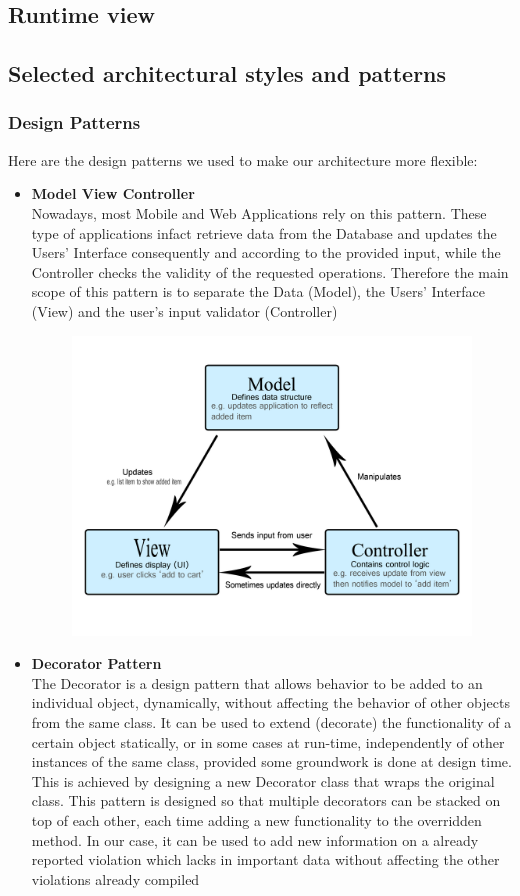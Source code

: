 \documentclass[12pt,a4paper]{article}
\begin{document}
\subsection{Runtime view}
\newpage
\subsection{Selected architectural styles and patterns}
\subsubsection{Design Patterns}
Here are the design patterns we used to make our architecture more flexible:
\begin{itemize}
\item \textbf{Model View Controller}\\
Nowadays, most Mobile and Web Applications rely on this pattern. These type of applications infact retrieve data from the Database and updates the Users' Interface consequently and according to the provided input, while the Controller checks the validity of the requested operations. Therefore the main scope of this pattern is to separate the Data (Model), the Users' Interface (View) and the user's input validator (Controller)
\begin{figure}[H]
		\centering
		\includegraphics[width=1.0\linewidth]{../assets/images/model-view-controller-light-blue.png}
	\end{figure}
\newpage
\item \textbf{Decorator Pattern}\\
The Decorator is a design pattern that allows behavior to be added to an individual object, dynamically, without affecting the behavior of other objects from the same class. It can be used to extend (decorate) the functionality of a certain object statically, or in some cases at run-time, independently of other instances of the same class, provided some groundwork is done at design time. This is achieved by designing a new Decorator class that wraps the original class. This pattern is designed so that multiple decorators can be stacked on top of each other, each time adding a new functionality to the overridden method. In our case, it can be used to add new information on a already reported violation which lacks in important data without affecting the other violations already compiled

\end{itemize}
\end{document}
